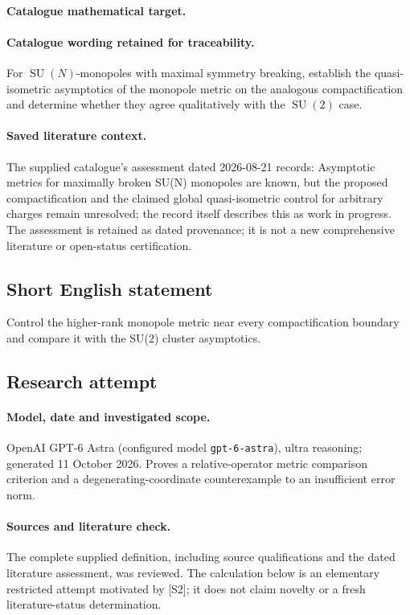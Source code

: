 \documentclass[11pt]{article}
\begin{document}
\paragraph{Catalogue mathematical target.}
\paragraph{Catalogue wording retained for traceability.}
For $\operatorname{SU}(N)$-monopoles with maximal symmetry breaking, establish the quasi-isometric asymptotics of the monopole metric on the analogous compactification and determine whether they agree qualitatively with the $\operatorname{SU}(2)$ case.

\paragraph{Saved literature context.} The supplied catalogue's assessment dated 2026-08-21 records: Asymptotic metrics for maximally broken SU(N) monopoles are known, but the proposed compactification and the claimed global quasi-isometric control for arbitrary charges remain unresolved; the record itself describes this as work in progress. The assessment is retained as dated provenance; it is not a new comprehensive literature or open-status certification.
\subsection{Short English statement}
Control the higher-rank monopole metric near every compactification boundary and compare it with the SU(2) cluster asymptotics.
\subsection{Research attempt}
\paragraph{Model, date and investigated scope.}
OpenAI GPT-6 Astra (configured model \texttt{gpt-6-astra}), ultra reasoning; generated 11 October 2026. Proves a relative-operator metric comparison criterion and a degenerating-coordinate counterexample to an insufficient error norm.

\paragraph{Sources and literature check.}
The complete supplied definition, including source qualifications and the dated literature assessment, was reviewed. The calculation below is an elementary restricted attempt motivated by [S2]; it does not claim novelty or a fresh literature-status determination.
\end{document}
